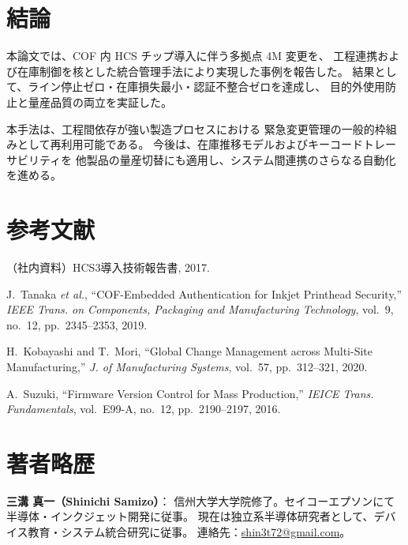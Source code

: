 \documentclass[journal,twocolumn]{IEEEtran}
\begin{document}
\section{結論}

本論文では、COF 内 HCS チップ導入に伴う多拠点 4M 変更を、
工程連携および在庫制御を核とした統合管理手法により実現した事例を報告した。
結果として、ライン停止ゼロ・在庫損失最小・認証不整合ゼロを達成し、
目的外使用防止と量産品質の両立を実証した。

本手法は、工程間依存が強い製造プロセスにおける
緊急変更管理の一般的枠組みとして再利用可能である。
今後は、在庫推移モデルおよびキーコードトレーサビリティを
他製品の量産切替にも適用し、システム間連携のさらなる自動化を進める。

\section*{参考文献}
\begin{thebibliography}{99}
（社内資料）HCS3導入技術報告書, 2017.

J.~Tanaka \emph{et al.}, ``COF-Embedded Authentication for Inkjet Printhead Security,''
\emph{IEEE Trans. on Components, Packaging and Manufacturing Technology},
vol.~9, no.~12, pp.~2345--2353, 2019.

H.~Kobayashi and T.~Mori, ``Global Change Management across Multi-Site Manufacturing,''
\emph{J. of Manufacturing Systems}, vol.~57, pp.~312--321, 2020.

A.~Suzuki, ``Firmware Version Control for Mass Production,''
\emph{IEICE Trans. Fundamentals}, vol.~E99-A, no.~12, pp.~2190--2197, 2016.
\end{thebibliography}

\section*{著者略歴}
\noindent\textbf{三溝 真一（Shinichi Samizo）}：
信州大学大学院修了。セイコーエプソンにて半導体・インクジェット開発に従事。
現在は独立系半導体研究者として、デバイス教育・システム統合研究に従事。
連絡先：\href{mailto:shin3t72@gmail.com}{shin3t72@gmail.com}。
\end{document}
